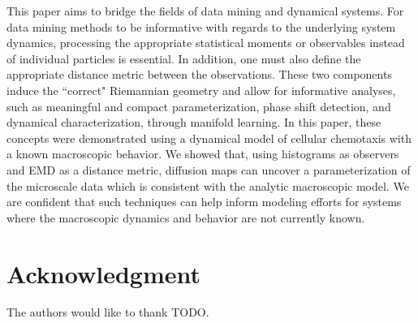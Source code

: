 \documentclass[preprint]{elsarticle}
\begin{document}
This paper aims to bridge the fields of data mining and dynamical systems. 
%
For data mining methods to be informative with regards to the underlying system dynamics, processing the appropriate statistical moments or observables instead of individual particles is essential. 
%
In addition, one must also define the appropriate distance metric between the observations.
%
These two components induce the ``correct" Riemannian geometry and allow for informative analyses, such as meaningful and compact parameterization, phase shift detection, and dynamical characterization, through manifold learning.
%
In this paper, these concepts were demonstrated using a dynamical model of cellular chemotaxis with a known macroscopic behavior.
%
We showed that, using histograms as observers and EMD as a distance metric, diffusion maps can uncover a parameterization of the microscale data which is consistent with the analytic macroscopic model.
%
We are confident that such techniques can help inform modeling efforts for systems where the macroscopic dynamics and behavior are not currently known. 


\section*{Acknowledgment}
The authors would like to thank TODO.



\end{document}
